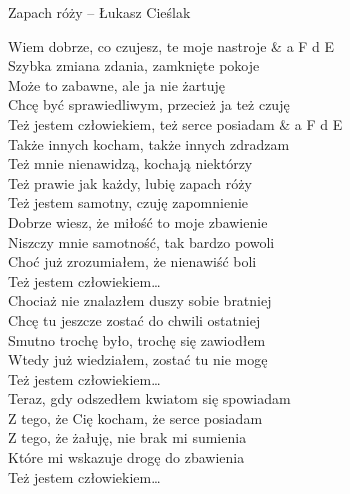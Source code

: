 \begin{piosenka}{Zapach róży -- Łukasz Cieślak}

Wiem dobrze, co czujesz, te moje nastroje & a F d E \\
Szybka zmiana zdania, zamknięte pokoje \\
Może to zabawne, ale ja nie żartuję \\
Chcę być sprawiedliwym, przecież ja też czuję \\[\zwrotkaspace]

 Też jestem człowiekiem, też serce posiadam & a F d E \\
 Także innych kocham, także innych zdradzam \\
 Też mnie nienawidzą, kochają niektórzy \\
 Też prawie jak każdy, lubię zapach róży \\[\zwrotkaspace]

Też jestem samotny, czuję zapomnienie \\
Dobrze wiesz, że miłość to moje zbawienie \\
Niszczy mnie samotność, tak bardzo powoli \\
Choć już zrozumiałem, że nienawiść boli \\[\zwrotkaspace]

 Też jestem człowiekiem\ldots \\[\zwrotkaspace]

Chociaż nie znalazłem duszy sobie bratniej \\
Chcę tu jeszcze zostać do chwili ostatniej \\
Smutno trochę było, trochę się zawiodłem \\
Wtedy już wiedziałem, zostać tu nie mogę \\[\zwrotkaspace]


 Też jestem człowiekiem\ldots \\[\zwrotkaspace]

Teraz, gdy odszedłem kwiatom się spowiadam \\
Z tego, że Cię kocham, że serce posiadam \\
Z tego, że żałuję, nie brak mi sumienia \\
Które mi wskazuje drogę do zbawienia \\[\zwrotkaspace]

 Też jestem człowiekiem\ldots \\[\zwrotkaspace]

\end{piosenka}
